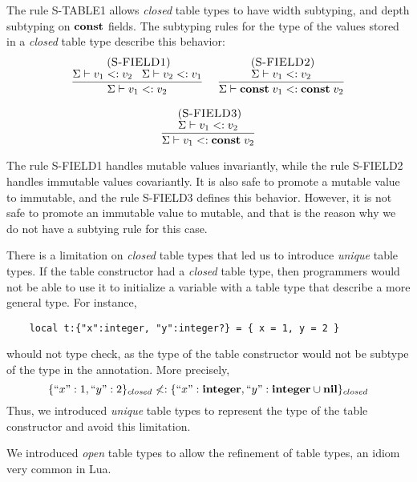The rule \textsc{S-TABLE1} allows \emph{closed} table types to
have width subtyping, and depth subtyping on $\mathbf{const}$ fields.
The subtyping rules for the type of the values stored in a \emph{closed}
table type describe this behavior:
\[
\begin{array}{c}
\begin{array}{c}
\; (\textsc{S-FIELD1})\\
\dfrac{\Sigma \vdash v_{1} <: v_{2} \;\;\;
       \Sigma \vdash v_{2} <: v_{1}}
      {\Sigma \vdash v_{1} <: v_{2}}
\end{array}
\;
\begin{array}{c}
\; (\textsc{S-FIELD2})\\
\dfrac{\Sigma \vdash v_{1} <: v_{2}}
      {\Sigma \vdash \mathbf{const} \; v_{1} <: \mathbf{const} \; v_{2}}
\end{array}
\\ \\
\begin{array}{c}
\; (\textsc{S-FIELD3})\\
\dfrac{\Sigma \vdash v_{1} <: v_{2}}
      {\Sigma \vdash v_{1} <: \mathbf{const} \; v_{2}}
\end{array}
\end{array}
\]

The rule \textsc{S-FIELD1} handles mutable values invariantly,
while the rule \textsc{S-FIELD2} handles immutable values covariantly.
It is also safe to promote a mutable value to immutable, and the rule
\textsc{S-FIELD3} defines this behavior.
However, it is not safe to promote an immutable value to mutable,
and that is the reason why we do not have a subtying rule for this case.

There is a limitation on \emph{closed} table types that led us to
introduce \emph{unique} table types.
If the table constructor had a \emph{closed} table type, then
programmers would not be able to use it to initialize a variable with
a table type that describe a more general type.
For instance,
\begin{verbatim}
    local t:{"x":integer, "y":integer?} = { x = 1, y = 2 }
\end{verbatim}
whould not type check, as the type of the table constructor would not
be subtype of the type in the annotation.
More precisely,
\[
\{``x":1, ``y":2\}_{closed} \not<: \{``x":\mathbf{integer}, ``y":\mathbf{integer} \cup \mathbf{nil}\}_{closed}
\]
Thus, we introduced \emph{unique} table types to represent the type of
the table constructor and avoid this limitation.

We introduced \emph{open} table types to allow the refinement of table types,
an idiom very common in Lua.

